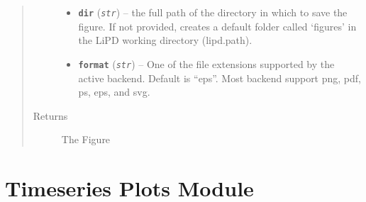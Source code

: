 \documentclass[letterpaper,10pt,english]{sphinxmanual}
\begin{document}
\begin{fulllineitems}
\begin{fulllineitems}
\begin{quote}
\begin{description}
\begin{itemize}
\item {} 
\textbf{\texttt{dir}} (\emph{\texttt{str}}) -- the full path of the directory in which to save the
figure. If not provided, creates a default folder called
`figures' in the LiPD working directory (lipd.path).

\item {} 
\textbf{\texttt{format}} (\emph{\texttt{str}}) -- One of the file extensions supported by the active
backend. Default is ``eps''. Most backend support png, pdf, ps,
eps, and svg.

\end{itemize}

\item[{Returns}] \leavevmode
The Figure

\end{description}\end{quote}

\end{fulllineitems}


\end{fulllineitems}



\chapter{Timeseries Plots Module}
\label{TSPlots::doc}\label{TSPlots:timeseries-plots-module}
\end{document}
